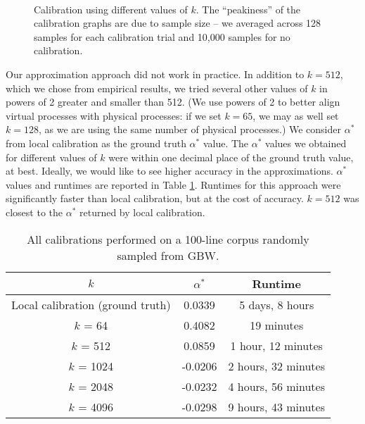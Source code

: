 \documentclass[pageno]{jpaper}
\begin{document}
\begin{figure}[!ht]
    \centering
    \\
    \caption{Calibration using different values of $k$. The ``peakiness'' of the calibration graphs are due to sample size -- we averaged across 128 samples for each calibration trial and 10,000 samples for no calibration.}
    \label{fig:alg3results}
 \end{figure}

Our approximation approach did not work in practice. In addition to $k=512$, which we chose from empirical results, we tried several other values of $k$ in powers of 2 greater and smaller than 512. (We use powers of 2 to better align virtual processes with physical processes: if we set $k=65$, we may as well set $k=128$, as we are using the same number of physical processes.) We consider $\alpha^*$ from local calibration as the ground truth $\alpha^*$ value. The $\alpha^*$ values we obtained for different values of $k$ were within one decimal place of the ground truth value, at best. Ideally, we would like to see higher accuracy in the approximations. $\alpha^*$ values and runtimes are reported in Table \ref{approximation-results}. Runtimes for this approach were significantly faster than local calibration, but at the cost of accuracy. $k = 512$ was closest to the $\alpha^*$ returned by local calibration.

\begin{table}[ht]
    \centering
    \begin{tabular}[t]{ccc}
    $k$ & $\alpha^*$ & Runtime \\
    \hline
    \hline
    Local calibration (ground truth) & 0.0339 & 5 days, 8 hours  \\
    \hline
    $k$ = 64 & 0.4082 & 19 minutes \\
    $k$ = 512 & 0.0859 & 1 hour, 12 minutes\\
    $k$ = 1024 & -0.0206 & 2 hours, 32 minutes\\
    $k$ = 2048 & -0.0232 & 4 hours, 56 minutes\\
    $k$ = 4096 & -0.0298 & 9 hours, 43 minutes
    \end{tabular}
    \caption{All calibrations performed on a 100-line corpus randomly sampled from GBW.}
    \label{approximation-results}
\end{table}%
\end{document}
